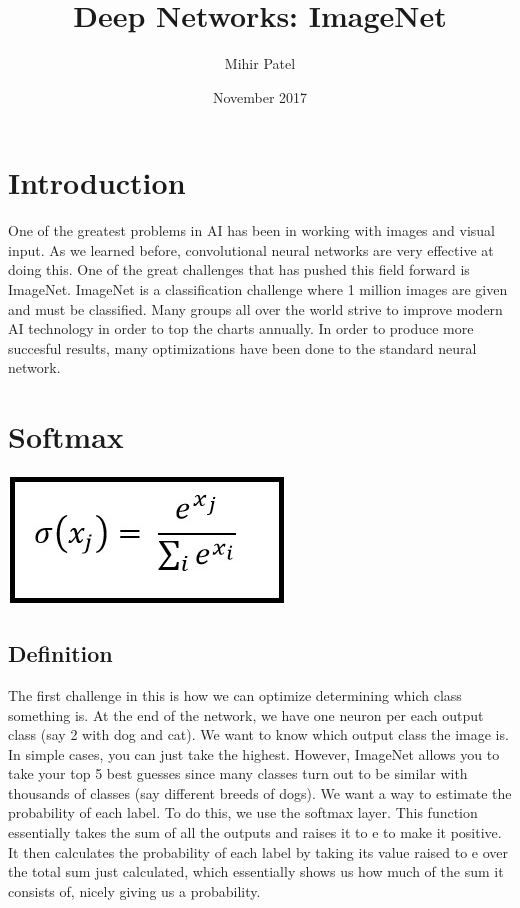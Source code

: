 \documentclass{article}
\title{Deep Networks: ImageNet}
\author{Mihir Patel}
\date{November 2017}
\begin{document}
\maketitle

\section{Introduction}
One of the greatest problems in AI has been in working with images and visual input. As we learned before, convolutional neural networks are very effective at doing this. One of the great challenges that has pushed this field forward is ImageNet. ImageNet is a classification challenge where 1 million images are given and must be classified. Many groups all over the world strive to improve modern AI technology in order to top the charts annually. In order to produce more succesful results, many optimizations have been done to the standard neural network.

\section{Softmax}
\begin{center}
\includegraphics[scale=0.5]{softmax}
\end{center}
\subsection{Definition}
The first challenge in this is how we can optimize determining which class something is. At the end of the network, we have one neuron per each output class (say 2 with dog and cat). We want to know which output class the image is. In simple cases, you can just take the highest. However, ImageNet allows you to take your top 5 best guesses since many classes turn out to be similar with thousands of classes (say different breeds of dogs). We want a way to estimate the probability of each label. To do this, we use the softmax layer. This function essentially takes the sum of all the outputs and raises it to e to make it positive. It then calculates the probability of each label by taking its value raised to e over the total sum just calculated, which essentially shows us how much of the sum it consists of, nicely giving us a probability.
\end{document}
